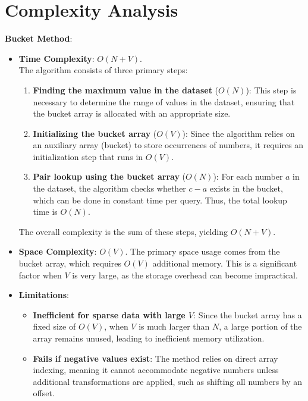 \documentclass{report}
\begin{document}
\section*{Complexity Analysis}
    \textbf{Bucket Method}:
    \begin{itemize}
        \item \textbf{Time Complexity}: \(O(N + V)\).\\
        The algorithm consists of three primary steps: 
        \begin{enumerate}
            \item \textbf{Finding the maximum value in the dataset} (\(O(N)\)): This step is necessary to determine the range of values in the dataset, ensuring that the bucket array is allocated with an appropriate size.
            \item \textbf{Initializing the bucket array} (\(O(V)\)): Since the algorithm relies on an auxiliary array (bucket) to store occurrences of numbers, it requires an initialization step that runs in \(O(V)\).
            \item \textbf{Pair lookup using the bucket array} (\(O(N)\)): For each number \(a\) in the dataset, the algorithm checks whether \(c - a\) exists in the bucket, which can be done in constant time per query. Thus, the total lookup time is \(O(N)\).
        \end{enumerate}
        The overall complexity is the sum of these steps, yielding \(O(N + V)\).

        \item \textbf{Space Complexity}: \(O(V)\).  
        The primary space usage comes from the bucket array, which requires \(O(V)\) additional memory. This is a significant factor when \(V\) is very large, as the storage overhead can become impractical.

        \item \textbf{Limitations}:
        \begin{itemize}   
            \item \textbf{Inefficient for sparse data with large \(V\)}: Since the bucket array has a fixed size of \(O(V)\), when \(V\) is much larger than \(N\), a large portion of the array remains unused, leading to inefficient memory utilization.
            \item \textbf{Fails if negative values exist}: The method relies on direct array indexing, meaning it cannot accommodate negative numbers unless additional transformations are applied, such as shifting all numbers by an offset.
        \end{itemize}
    \end{itemize}
\end{document}
